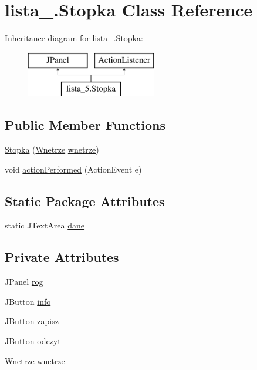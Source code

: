 \hypertarget{classlista__5_1_1_stopka}{}\section{lista\+\_.\+Stopka Class Reference}
\label{classlista__5_1_1_stopka}
Inheritance diagram for lista\+\_.\+Stopka\+:\begin{figure}[H]
\begin{center}
\leavevmode
\includegraphics[height=2.000000cm]{classlista__5_1_1_stopka}
\end{center}
\end{figure}
\subsection*{Public Member Functions}
\begin{DoxyCompactItemize}
\item 
\mbox{\hyperlink{classlista__5_1_1_stopka_aca2946bc95b1b607793c5e57fc2ed995}{Stopka}} (\mbox{\hyperlink{classlista__5_1_1_wnetrze}{Wnetrze}} \mbox{\hyperlink{classlista__5_1_1_stopka_a047d15d43be6d71f8a27a3fa4528b272}{wnetrze}})
\item 
void \mbox{\hyperlink{classlista__5_1_1_stopka_a6cce6029ebcb4c780c78442687aadd8f}{action\+Performed}} (Action\+Event e)
\end{DoxyCompactItemize}
\subsection*{Static Package Attributes}
\begin{DoxyCompactItemize}
\item 
static J\+Text\+Area \mbox{\hyperlink{classlista__5_1_1_stopka_a8e8ef21758defd5b137e609b00d2f59e}{dane}}
\end{DoxyCompactItemize}
\subsection*{Private Attributes}
\begin{DoxyCompactItemize}
\item 
J\+Panel \mbox{\hyperlink{classlista__5_1_1_stopka_a5a1436f164fa7f3e65c148fb8716319f}{rog}}
\item 
J\+Button \mbox{\hyperlink{classlista__5_1_1_stopka_a77dc029a3ed5c0ea4d49b1279a01b1bc}{info}}
\item 
J\+Button \mbox{\hyperlink{classlista__5_1_1_stopka_a0086583a29887591d27fcfef4438b199}{zapisz}}
\item 
J\+Button \mbox{\hyperlink{classlista__5_1_1_stopka_a658e033afcd318e8f01051b5ff0caa0b}{odczyt}}
\item 
\mbox{\hyperlink{classlista__5_1_1_wnetrze}{Wnetrze}} \mbox{\hyperlink{classlista__5_1_1_stopka_a047d15d43be6d71f8a27a3fa4528b272}{wnetrze}}
\end{DoxyCompactItemize}


